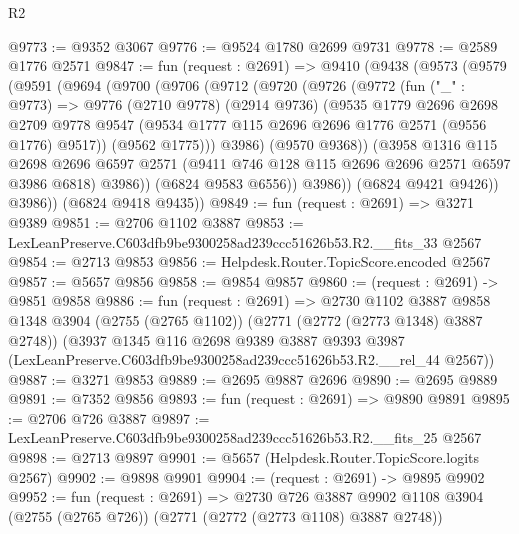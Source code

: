 \begin{lexlean}{R2}
\begin{coremodule}
@9773 := @9352 @3067
@9776 := @9524 @1780 @2699 @9731
@9778 := @2589 @1776 @2571
@9847 := fun (request : @2691) =>
  @9410
    (@9438
      (@9573
        (@9579
          (@9591
            (@9694
              (@9700
                (@9706
                  (@9712
                    (@9720
                      (@9726
                        (@9772
                          (fun ("_" : @9773) =>
                          @9776
                            (@2710 @9778)
                            (@2914 @9736)
                            (@9535
                              @1779
                              @2696
                              @2698
                              @2709
                              @9778
                              @9547
                              (@9534 @1777 @115 @2696 @2696 @1776 @2571 (@9556 @1776) @9517))
                            (@9562 @1775)))
                        @3986)
                      (@9570 @9368))
                    (@3958
                      @1316
                      @115
                      @2698
                      @2696
                      @6597
                      @2571
                      (@9411 @746 @128 @115 @2696 @2696 @2571 @6597 @3986 @6818)
                      @3986))
                  (@6824 @9583 @6556))
                @3986))
            (@6824 @9421 @9426))
          @3986))
      (@6824 @9418 @9435))
@9849 := fun (request : @2691) => @3271 @9389
@9851 := @2706 @1102 @3887
@9853 := LexLeanPreserve.C603dfb9be9300258ad239ccc51626b53.R2.__fits_33 @2567
@9854 := @2713 @9853
@9856 := Helpdesk.Router.TopicScore.encoded @2567
@9857 := @5657 @9856
@9858 := @9854 @9857
@9860 := (request : @2691) -> @9851 @9858
@9886 := fun (request : @2691) =>
  @2730
    @1102
    @3887
    @9858
    @1348
    @3904
    (@2755 (@2765 @1102))
    (@2771 (@2772 (@2773 @1348) @3887 @2748))
    (@3937
      @1345
      @116
      @2698
      @9389
      @3887
      @9393
      @3987
      (LexLeanPreserve.C603dfb9be9300258ad239ccc51626b53.R2.__rel_44 @2567))
@9887 := @3271 @9853
@9889 := @2695 @9887 @2696
@9890 := @2695 @9889
@9891 := @7352 @9856
@9893 := fun (request : @2691) => @9890 @9891
@9895 := @2706 @726 @3887
@9897 := LexLeanPreserve.C603dfb9be9300258ad239ccc51626b53.R2.__fits_25 @2567
@9898 := @2713 @9897
@9901 := @5657 (Helpdesk.Router.TopicScore.logits @2567)
@9902 := @9898 @9901
@9904 := (request : @2691) -> @9895 @9902
@9952 := fun (request : @2691) =>
  @2730
    @726
    @3887
    @9902
    @1108
    @3904
    (@2755 (@2765 @726))
    (@2771 (@2772 (@2773 @1108) @3887 @2748))

\end{coremodule}
\end{lexlean}
